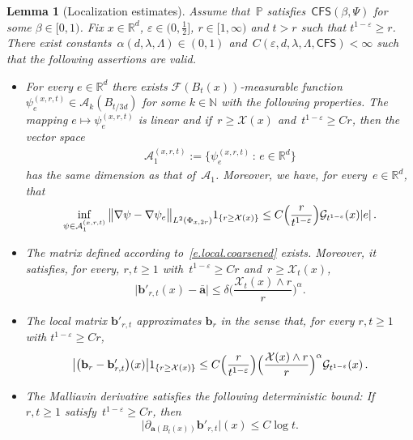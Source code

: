 \documentclass[11pt]{article} %
\numberwithin{equation}{section}
\newtheorem{lemma}[theorem]{Lemma}
\theoremstyle{definition}
\let\originalleft\left
\let\originalright\right
\renewcommand{\left}{\mathopen{}\mathclose\bgroup\originalleft}
\renewcommand{\right}{\aftergroup\egroup\originalright}
\newcommand*{\N}{\ensuremath{\mathbb{N}}}
\newcommand*{\R}{\ensuremath{\mathbb{R}}}
\newcommand{\eps}{\varepsilon}
\renewcommand{\b}{\ensuremath{\mathbf{b}}}
\newcommand{\ep}{\eps}
\renewcommand{\a}{\mathbf{a}}
\newcommand{\ahom}{\bar{\a}}
\newcommand{\F}{\mathcal{F}}
\renewcommand{\P}{\mathbb{P}}
\newcommand{\X}{\mathcal{X}}
\newcommand{\indc}{1}
\newcommand{\CFS}{\mathsf{CFS}}
\newcommand{\A}{\mathcal{A}}
\begin{document}
\begin{lemma}[Localization estimates]
\label{l.correctorloc}
Assume that~$\P$ satisfies~$\CFS(\beta,\Psi)$ for some $\beta \in [0,1)$. 
Fix $x\in \R^d$,  $\ep \in (0,\frac12]$, $r \in [1,\infty)$ and $t>r$ such that $t^{1-\ep} \geq r$. There exist constants~$\alpha(d,\lambda,\Lambda) \in (0,1)$ and~$C(\ep,d,\lambda,\Lambda,\CFS)<\infty$ such that the following assertions are valid. 
\begin{itemize}


\item 
For every $e \in \R^d$ there exists $\F(B_{t}(x))$-measurable function $\psi_e^{(x,r,t)} \in \A_k(B_{t/3d})$ for some $k \in \N$ with the following properties.  The mapping $e \mapsto \psi_{e}^{(x,r,t)}$ is linear and if~$r \geq \X(x)$ and~$t^{1-\ep} \geq C r$, then the vector space
\begin{align} \label{e.localA1}
\mathcal{A}_1^{(x,r,t)} := \big\{   \psi_{e}^{(x,r,t)} \, : \, e \in \R^d \big\} 
\end{align}
has the same dimension as that of~$\A_1$. Moreover, we have, for every~$e \in \R^d$, that
\begin{align}  \label{e.correctorloc.converse}
\inf_{\psi \in \mathcal{A}_1^{(x,r,t)}}
\big\|  \nabla \psi - \nabla \psi_e \big\|_{L^2(\Phi_{x,2r})}
\indc_{\{ r\geq \X(x) \}}
\leq 
C
\Bigl( \frac{r}{t^{1-\ep}} \Bigr)
\mathcal{G}_{t^{1-\ep}}(x)  |e| 
\,. 
\end{align}

\item 
The matrix defined according to~\eqref{e.local.coarsened} exists. Moreover, it satisfies, 
for every, $r,t\geq 1$ with~$t^{1-\ep} \geq C r$ and~$r\geq \X_t(x)$,
\begin{equation}
\label{e.matrix.local}
\big| {\b}'_{r,t}(x) - \ahom \big| \leq  \delta \biggl( \frac{\X_t(x) \wedge r}{r} \biggr)^{\alpha} .
\end{equation}

\item
The local matrix $\b'_{r,t}$ approximates $\b_r $ in the sense that, for every 
$r,t\geq 1$ with $t^{1-\ep} \geq Cr$,
\begin{equation} \label{e.localizationestimate}
\big| \bigl(\b_r - \b'_{r,t} \bigr)(x) \big| 
\indc_{\left\{ r \geq \X (x) \right\}}
\leq
C
\Bigl( \frac{r }{t^{1-\ep}} \Bigr)
\Bigl( \frac{\X(x) \wedge r}{r} \Bigr)^{\alpha} 
\mathcal{G}_{t^{1-\ep}}(x)
\,.
\end{equation}


\item 
The Malliavin derivative satisfies the following deterministic bound: If~$r,t\geq 1$ satisfy~$t^{1-\ep} \geq Cr$, then
\begin{equation}  \label{e.malliavin.local}
\bigl| \partial_{\a(B_{t}(x))}  \b'_{r,t}\bigr|  (x) \leq C \log t .
\end{equation}
\end{itemize}

\end{lemma}
\end{document}
